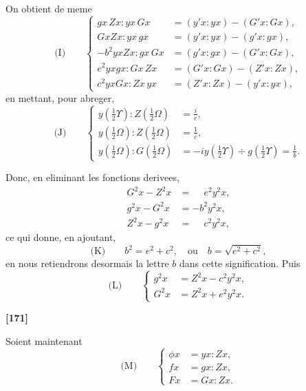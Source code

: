 \documentclass[11pt,a4paper]{book}
\begin{document}
On obtient de meme
\begin{equation*}
\text{(I)}\qquad
\left\{
\begin{aligned}
gx\, Zx : yx\, Gx &= (y'x : yx) - (G'x : Gx),\\
GxZx : yx\, gx &= (y'x : yx) - (g'x : gx),\\
-b^2yxZx : gx\, Gx &= (g'x : gx) - (G'x : Gx),\\
e^2yxgx : Gx\, Zx &= (G'x : Gx) - (Z'x : Zx),\\
c^2yxGx : Zx\, yx &= (Z'x : Zx) - (y'x : yx),
\end{aligned}
\right.
\end{equation*}
en mettant, pour abreger,
\begin{equation*}
\text{(J)}\qquad
\left\{
\begin{aligned}
y\left(\tfrac{1}{2}\Upsilon\right) : Z\left(\tfrac{1}{2}\Omega\right) &= \frac{i}{e},\\
y\left(\tfrac{1}{2}\Omega\right) : Z\left(\tfrac{1}{2}\Omega\right) &= \frac{1}{c},\\
y\left(\tfrac{1}{2}\Omega\right) : G\left(\tfrac{1}{2}\Omega\right) &= -iy\left(\tfrac{1}{2}\Upsilon\right) \div g\left(\tfrac{1}{2}\Upsilon\right) = \frac{1}{b}.
\end{aligned}
\right.
\end{equation*}

Donc, en eliminant les fonctions derivees,
\begin{align*}
G^2x - Z^2x &= \phantom{-}e^2 y^2x,\\
g^2x - G^2x &= -b^2 y^2x,\\
Z^2x - g^2x &= \phantom{-}c^2 y^2x,
\end{align*}
ce qui donne, en ajoutant,
\begin{equation*}
\text{(K)}\qquad b^2 = e^2 + c^2,\quad \text{ou}\quad b = \sqrt{e^2 + c^2},
\end{equation*}
en nous retiendrons desormais la lettre $b$ dans cette signification. Puis
\begin{equation*}
\text{(L)}\qquad
\left\{
\begin{aligned}
g^2x &= Z^2x - c^2 y^2x,\\
G^2x &= Z^2x + e^2 y^2x.
\end{aligned}
\right.
\end{equation*}


\textbf{[171]}

Soient maintenant
\begin{equation*}
\text{(M)}\qquad
\left\{
\begin{aligned}
\phi x &= yx : Zx,\\
fx &= gx : Zx,\\
Fx &= Gx : Zx.
\end{aligned}
\right.
\end{equation*}
\end{document}
